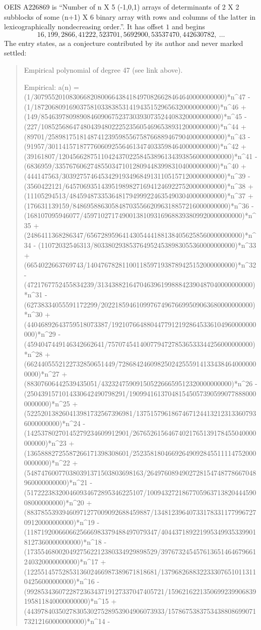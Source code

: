 \documentclass[11pt,a4paper]{article}
\theoremstyle{plain}
\theoremstyle{definition}
\begin{document}
OEIS A226869 is ``Number of n X 5 (-1,0,1) arrays of determinants of 2 X 2 subblocks of some (n+1) X 6 binary array with rows and columns of the latter in lexicographically nondecreasing order.''. It has offset $1$ and begins
\[
16, 199, 2866, 41222, 523701, 5692900, 53537470, 442630782,\ \dots
\]
The entry states, as a conjecture contributed by its author and never marked settled:
\begin{quote}
Empirical polynomial of degree 47 (see link above).

Empirical: a(n) = (1/307955201083066820800664384184970826628464640000000000)*n\^{}47 - (1/1872068091690375810338385314194351529656320000000000)*n\^{}46 + (149/854639780989084609067523730393073524408320000000000)*n\^{}45 - (227/10852568647480439480222523560546965389312000000000)*n\^{}44 + (89701/25898175181487412395985567587668894679040000000000)*n\^{}43 - (91957/301141571877760609255646134740335984640000000000)*n\^{}42 + (39161807/1204566287511042437022584538961343938560000000000)*n\^{}41 - (6836959/3357676062748550347101280944839983104000000000)*n\^{}40 + (444147563/3039275746453429193496849131105157120000000000)*n\^{}39 - (3560422121/645706935143951989827169412469227520000000000)*n\^{}38 + (11105294513/48459487335364817949992246354903040000000000)*n\^{}37 + (176631139159/84869588630584870355662096318857216000000000)*n\^{}36 - (168107095946077/459710271749001381093169688393809920000000000)*n\^{}35 + (2486411368286347/65672895964143054441881384056258560000000000)*n\^{}34 - (11072032546313/8033802938537649524538983055360000000000)*n\^{}33 + (6654022663769743/140476782811001185971938789425152000000000)*n\^{}32 - (4721767752455834239/31343882164704639619988842390487040000000000)*n\^{}31 - (62738334055591172299/2022185946109976749676699509063680000000000)*n\^{}30 + (44046892643759518073387/19210766488044779121928645336104960000000000)*n\^{}29 - (4594047449146342662641/75707454140077947278536533344256000000000)*n\^{}28 + (6624405552122732850651449/7286842460982502425559141334384640000000000)*n\^{}27 + (88307606442539435051/4323247590915052266659512320000000000)*n\^{}26 - (2504391571014330642490798291/1909941613704815450573905990778880000000000)*n\^{}25 + (522520138260413981732567396981/13751579618674671244132123133607936000000000)*n\^{}24 - (14253780270145279234609912901/26765261564674021765139178455040000000000)*n\^{}23 + (13658882725587266171398308601/252358180466926490928455111147520000000000)*n\^{}22 + (548747600770380391371503803698163/2649760894902728154748778667048960000000000)*n\^{}21 - (517222383200460934672895346225107/100943272186770596371382044459008000000000)*n\^{}20 + (88378553939460971277009092688459887/1348123964073317833117799672709120000000000)*n\^{}19 - (1187192006606625666983379488497079347/4044371892219953499353399018127360000000000)*n\^{}18 - (1735546800204927562212380334929898529/397673245457613651464679661240320000000000)*n\^{}17 + (1225514575285313602466987389671818681/13796826883223330765101131104256000000000)*n\^{}16 - (992853436072287236343719127337047405721/1596216221350699239906839195811840000000000)*n\^{}15 + (443978403502783053027528953904906073933/157867538375343880869907173212160000000000)*n\^{}14 - 
\end{quote}
\end{document}
